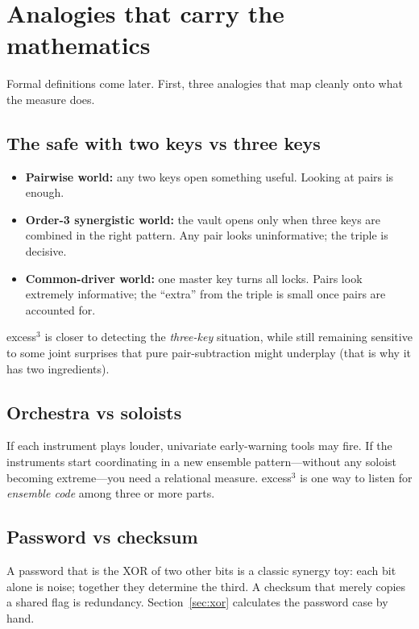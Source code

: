 \documentclass[11pt,a4paper]{article}
\begin{document}
\section{Analogies that carry the mathematics}
\label{sec:analogies}

Formal definitions come later. First, three analogies that map cleanly onto
what the measure does.

\subsection{The safe with two keys vs three keys}

\begin{itemize}[leftmargin=*,itemsep=3pt]
  \item \textbf{Pairwise world:} any two keys open something useful.
  Looking at pairs is enough.
  \item \textbf{Order-3 synergistic world:} the vault opens only when three
  keys are combined in the right pattern. Any pair looks uninformative;
  the triple is decisive.
  \item \textbf{Common-driver world:} one master key turns all locks. Pairs
  look extremely informative; the ``extra'' from the triple is small once
  pairs are accounted for.
\end{itemize}
excess$^3$ is closer to detecting the \emph{three-key} situation, while
still remaining sensitive to some joint surprises that pure pair-subtraction
might underplay (that is why it has two ingredients).

\subsection{Orchestra vs soloists}

If each instrument plays louder, univariate early-warning tools may fire.
If the instruments start coordinating in a new ensemble pattern---without
any soloist becoming extreme---you need a relational measure. excess$^3$ is
one way to listen for \emph{ensemble code} among three or more parts.

\subsection{Password vs checksum}

A password that is the XOR of two other bits is a classic synergy toy: each
bit alone is noise; together they determine the third. A checksum that
merely copies a shared flag is redundancy. Section~\ref{sec:xor} calculates
the password case by hand.
\end{document}
